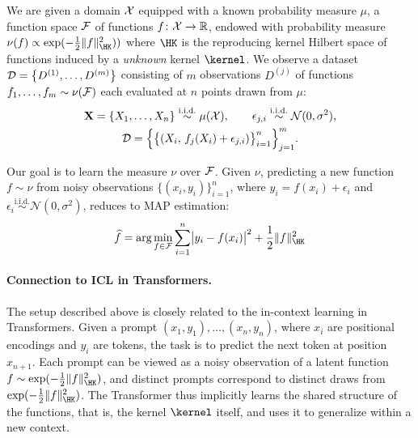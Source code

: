 \documentclass{article}
\newcommand{\nsamples}{{n}}
\newcommand{\nfunctions}{{m}}
\begin{document}
We are given a domain $\mathcal{X}$ equipped with a known probability measure $\mu$,
a function space $\mathcal{F}$ of functions $f \colon \mathcal{X} \to \mathbb{R}$,
endowed with probability measure $\nu(f) \propto \exp(-\frac{1}{2}\|f\|_{\HK}^2))$ where $\HK$ is the reproducing kernel Hilbert space of functions induced by a \emph{unknown} kernel $\kernel$.
We observe a dataset $\dataset = \left\{ D^{(1)}, \ldots, D^{(\nfunctions)} \right\}$ consisting of $\nfunctions$ observations $D^{(j)}$ of functions $f_1, \ldots, f_{\nfunctions} \sim \nu(\ffam)$
each evaluated at $\nsamples$ points drawn from $\mu$:
\begin{gather*}
	\mathbf{X} = \{X_1, \ldots, X_{\nsamples}\} \overset{\text{i.i.d.}}{\sim} \mu(\domain), \qquad
	\epsilon_{j,i} \overset{\text{i.i.d.}}{\sim} \mathcal{N}(0, \sigma^2), \\
	\dataset = \Bigl\{
	\bigl\{ (X_i,\, f_j(X_i) + \epsilon_{j,i}) \bigr\}_{i=1}^{\nsamples}
	\Bigr\}_{j=1}^{\nfunctions}.
\end{gather*}

Our goal is to learn the measure $\nu$ over $\mathcal{F}$.
Given $\nu$, predicting a new function $f \sim \nu$ from noisy observations
$\{(x_i, y_i)\}_{i=1}^{\nsamples}$, where $y_i = f(x_i) + \epsilon_i$ and
$\epsilon_i \overset{\text{i.i.d.}}{\sim} \mathcal{N}(0, \sigma^2)$,
reduces to MAP estimation:
\begin{align*}
	\hat{f}
	= \arg\min_{f \in \ffam}
	\sum_{i=1}^{\nsamples} \bigl| y_i - f(x_i) \bigr|^2
	+ \frac{1}{2}\|f\|_{\HK}^2
\end{align*}


\paragraph{Connection to ICL in Transformers.}

The setup described above is closely related to the in-context learning in Transformers.
Given a prompt $(x_1, y_1), \ldots, (x_{\nsamples}, y_{\nsamples})$, where $x_i$ are positional encodings
and $y_i$ are tokens, the task is to predict the next token at position $x_{\nsamples+1}$.
Each prompt can be viewed as a noisy observation of a latent function $f \sim \exp(-\frac{1}{2}\|f\|_{\HK}^2)$,
and distinct prompts correspond to distinct draws from $\exp(-\frac{1}{2}\|f\|_{\HK}^2)$.
The Transformer thus implicitly learns the shared structure of the functions,
that is, the kernel $\kernel$ itself, and uses it to generalize within a new context.

\end{document}

